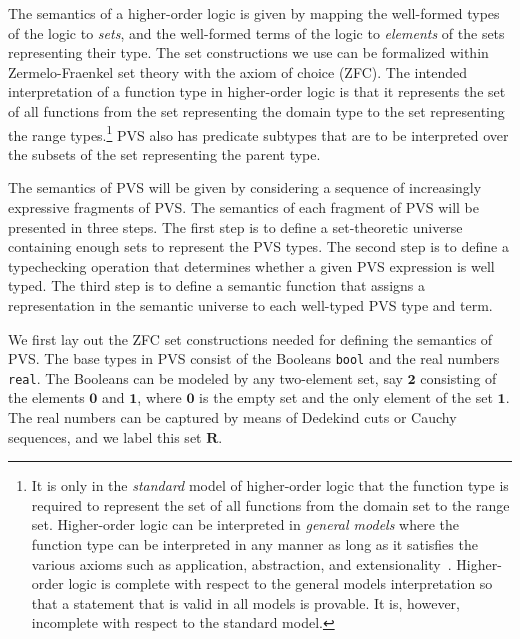 \documentclass [12pt,twoside]{cslreport}
\newcommand{\twob}{\mathbf{2}}
\newcommand{\oneb}{\mathbf{1}}
\newcommand{\zerob}{\mathbf{0}}
\newcommand{\reals}{\mathbf{R}}
\begin{document}
The semantics of a higher-order logic is given by mapping the well-formed
types of the logic to {\em sets\/}, and the well-formed terms of the logic to
{\em elements\/} of the sets representing their type.  The set
constructions we use can be formalized within Zermelo-Fraenkel set theory
with the axiom of choice (ZFC).   The intended interpretation
of a function type in higher-order logic is that it represents the set of
all functions from the set representing the domain type to the set
representing the range types.\footnote{It is only in the {\em standard\/}
model of higher-order logic that the function type is required to
represent the set of all 
functions from the domain set to the range set.  Higher-order logic can be
interpreted in {\em general models\/} where the function type can be
interpreted in any manner as long as it satisfies the various axioms
such as application, abstraction, and extensionality~\cite{Andrews:book}.
Higher-order logic 
is complete with respect to the general models interpretation so that
a statement that is valid in all models is provable.  It is, however,
incomplete with respect to the standard model.}  
PVS also has predicate subtypes that are to
be interpreted over the subsets of the set representing the parent type.

The semantics of PVS will be given by considering a sequence of
increasingly expressive fragments of PVS\@.   
The semantics of each fragment of PVS will be presented in three steps.
The first step is to define a set-theoretic universe containing
enough sets to represent the PVS types.  The second step is to define a
typechecking operation that determines whether a given PVS expression is
well typed.  The third step is to define a semantic function that assigns
a representation in the semantic universe to each well-typed PVS type and
term. 





We first lay out the ZFC set constructions needed for defining the
semantics of PVS.  The base types in PVS consist of the Booleans
\texttt{bool} and the real numbers \texttt{real}\@.  The Booleans can be
modeled by any two-element set, say $\twob$ consisting of the elements
$\zerob$ and $\oneb$, where $\zerob$ is the empty set and the only element
of the set $\oneb$\@.  The real numbers can be captured by means of
Dedekind cuts or Cauchy sequences, and we label this set $\reals$\@.
\end{document}
